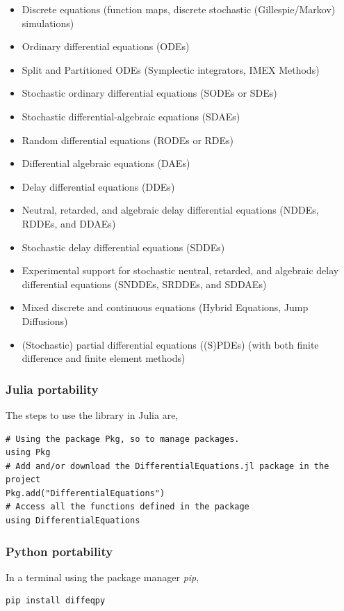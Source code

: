 \documentclass[
12pt,				%
openright,			%
oneside,			%
a4paper,			%
brazil,				%
english,			%
]{abntex2}
\begin{document}
\begin{itemize}
\item Discrete equations (function maps, discrete stochastic (Gillespie/Markov) simulations)
\item Ordinary differential equations (ODEs)
\item Split and Partitioned ODEs (Symplectic integrators, IMEX Methods)
\item Stochastic ordinary differential equations (SODEs or SDEs)
\item Stochastic differential-algebraic equations (SDAEs)
\item Random differential equations (RODEs or RDEs)
\item Differential algebraic equations (DAEs)
\item Delay differential equations (DDEs)
\item Neutral, retarded, and algebraic delay differential equations (NDDEs, RDDEs, and DDAEs)
\item Stochastic delay differential equations (SDDEs)
\item Experimental support for stochastic neutral, retarded, and algebraic delay differential equations (SNDDEs, SRDDEs, and SDDAEs)
\item Mixed discrete and continuous equations (Hybrid Equations, Jump Diffusions)
\item (Stochastic) partial differential equations ((S)PDEs) (with both finite difference and finite element methods)
\end{itemize}

\subsubsection{Julia portability}

The steps to use the library in Julia are,

\begin{verbatim}
# Using the package Pkg, so to manage packages. 
using Pkg
# Add and/or download the DifferentialEquations.jl package in the project 
Pkg.add("DifferentialEquations")
# Access all the functions defined in the package 
using DifferentialEquations
\end{verbatim}

\subsubsection{Python portability}

In a terminal using the package manager \textit{pip},
\begin{verbatim}
pip install diffeqpy
\end{verbatim}
\end{document}
